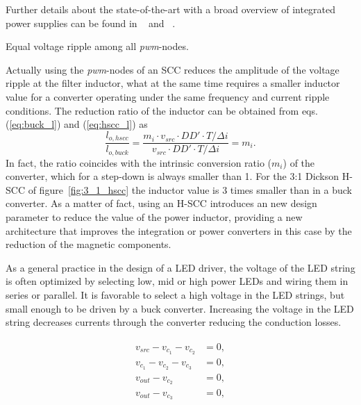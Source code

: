 

 Further details about the state-of-the-art with a broad overview of integrated power supplies can be found in ~\cite{2013Breussegem:int_conv} and ~\cite{2013villar}.

Equal voltage ripple among all \emph{pwm}-nodes.

Actually using the \emph{pwm}-nodes of an SCC reduces the amplitude of the voltage ripple at the filter inductor, what at the same time requires a smaller inductor value for a converter operating under the same frequency and current ripple conditions. The reduction ratio of the inductor can be obtained from eqs. (\ref{eq:buck_l}) and (\ref{eq:hscc_l}) as
\begin{equation}
 \frac{l_{o,hscc}}{l_{o,buck}} =  \frac{{ m_i \cdot v_{src} \cdot DD' \cdot T}/{\Delta i} }{{  v_{src} \cdot DD' \cdot T}/{\Delta i}} = m_i.
\label{eq:l_m}
\end{equation}
In fact, the ratio coincides with the intrinsic conversion ratio ($m_i$) of the converter, which for a step-down is always smaller than 1. For the 3:1 Dickson H-SCC of figure~\ref{fig:3_1_hscc} the inductor value is 3 times smaller than in a buck converter. As a matter of fact, using an H-SCC introduces an new design parameter to reduce the value of the power inductor, providing a new architecture that improves the integration or power converters in this case by the reduction of the magnetic components.


As a general practice in the design of a LED driver, the voltage of
the LED string is often optimized by selecting low, mid or high
power LEDs and wiring them in series or parallel. It is favorable
to select a high voltage in the LED strings, but small enough to be
driven by a buck converter. Increasing the voltage in the LED
string decreases currents through the converter reducing the
conduction losses.

\begin{align}
\begin{split}
  v_{src} - v_{c_1} - v_{c_2} &=0, \\
  v_{c_1} - v_{c_2} - v_{c_3} &=0, \\
  v_{out} - v_{c_2}  &=0,\\
  v_{out} - v_{c_3}  &=0,
\end{split}
\end{align}

